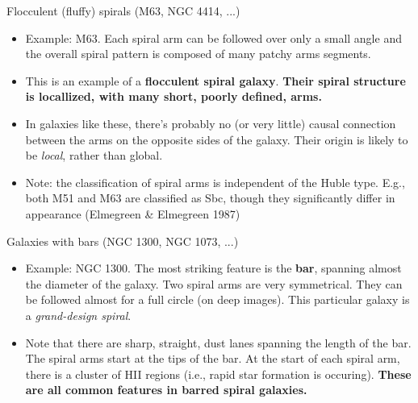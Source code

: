 \documentclass[letterpaper,landscape]{slides}
\begin{document}
\begin{slide}
\begin{center}
{\large \color{red} 
                  Flocculent (fluffy) spirals (M63, NGC 4414, ...)  }
\end{center}

\begin{itemize}
\item Example: M63. Each spiral arm can be followed over only a small angle
and the overall spiral pattern is composed of many patchy arms segments.

\item This is an example of a {\bf flocculent spiral galaxy}.
{\bf Their spiral structure is locallized, with many short, poorly defined,
arms.}

\item In galaxies like these, there's probably no (or very little) causal
connection between the arms on the opposite sides of the galaxy. Their
origin is likely to be {\em local}, rather than global.

\item Note: the classification of spiral arms is independent of the Huble
type. E.g., both M51 and M63 are classified as Sbc, though they
significantly differ in appearance (Elmegreen \& Elmegreen 1987)

\end{itemize}

\vfill
\end{slide}


\begin{slide}
\begin{center}
{\large \color{red} 
                  Galaxies with bars (NGC 1300, NGC 1073, ...)  }
\end{center}

\begin{itemize}
\item Example: NGC 1300. The most striking feature is the {\bf bar},
spanning almost the diameter of the galaxy. Two spiral arms are very
symmetrical. They can be followed almost for a full circle (on deep images).
This particular galaxy is a {\em grand-design spiral}.

\item Note that there are sharp, straight, dust lanes spanning the length of
the bar. The spiral arms start at the tips of the bar. At the start of each
spiral arm, there is a cluster of HII regions (i.e., rapid star formation is
occuring). {\bf These are all common features in barred spiral galaxies.}

\end{itemize}

\vfill
\end{slide}
\end{document}

